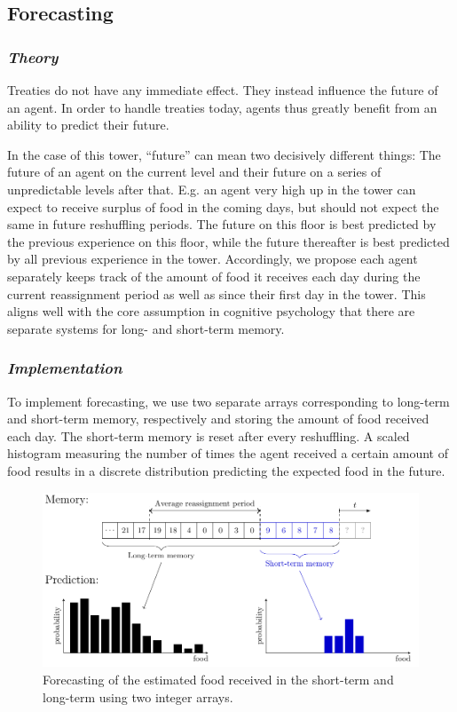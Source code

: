 \subsection{Forecasting}

\subsubsection{\textit{Theory}}

Treaties do not have any immediate effect. They instead influence the future of an agent. In order to handle treaties today, agents thus greatly benefit from an ability to predict their future.

In the case of this tower, “future” can mean two decisively different things: The future of an agent on the current level and their future on a series of unpredictable levels after that. E.g. an agent very high up in the tower can expect to receive surplus of food in the coming days, but should not expect the same in future reshuffling periods. The future on this floor is best predicted by the previous experience on this floor, while the future thereafter is best predicted by all previous experience in the tower. Accordingly, we propose each agent separately keeps track of the amount of food it receives each day during the current reassignment period as well as since their first day in the tower. This aligns well with the core assumption in cognitive psychology that there are separate systems for long- and short-term memory.\cite{norris2017short}

\subsubsection{\textit{Implementation}}
To implement forecasting, we use two separate arrays corresponding to long-term and short-term memory, respectively and storing the amount of food received each day. The short-term memory is reset after every reshuffling. A scaled histogram measuring the number of times the agent received a certain amount of food results in a discrete distribution predicting the expected food in the future.

\begin{figure} [h!]
    \centering
    \includegraphics[width=0.9\linewidth]{008_team_6_agent_design/SOMAS_forecasting.pdf}
    \caption{Forecasting of the estimated food received in the short-term and long-term using two integer arrays.}
    \label{fig:forecasting}
\end{figure}

